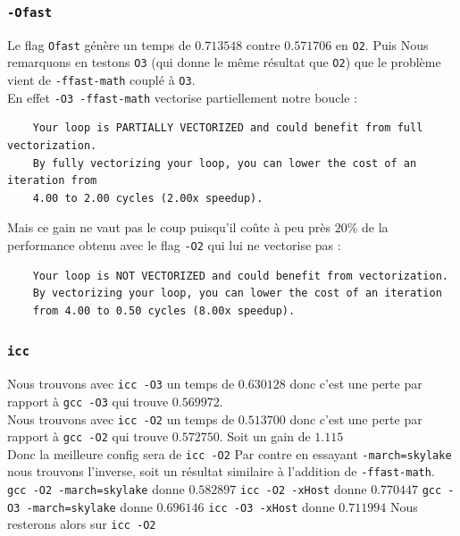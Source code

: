 \documentclass{report}
\begin{document}
  \subsubsection{\texttt{-Ofast}}
  Le flag \texttt{Ofast} génère un temps de $0.713548$ contre $0.571706$ en \texttt{O2}. Puis Nous remarquons
  en testons \texttt{O3} (qui donne le même résultat que \texttt{O2}) que le problème vient de \texttt{-ffast-math}
  couplé à \texttt{O3}. \\
  En effet \texttt{-O3 -ffast-math} vectorise partiellement notre boucle :
  \begin{verbatim}
    Your loop is PARTIALLY VECTORIZED and could benefit from full vectorization.
    By fully vectorizing your loop, you can lower the cost of an iteration from
    4.00 to 2.00 cycles (2.00x speedup).
  \end{verbatim}
  Mais ce gain ne vaut pas le coup puisqu'il coûte à peu près $20\%$ de
  la performance obtenu avec le flag \texttt{-O2} qui lui ne vectorise pas :
  \begin{verbatim}
    Your loop is NOT VECTORIZED and could benefit from vectorization.
    By vectorizing your loop, you can lower the cost of an iteration
    from 4.00 to 0.50 cycles (8.00x speedup).
  \end{verbatim}
  \subsubsection{\texttt{icc}}
  Nous trouvons avec \texttt{icc -O3} un temps de $0.630128$ donc c'est une
  perte par rapport à \texttt{gcc -O3} qui trouve $0.569972$.\\
  Nous trouvons avec \texttt{icc -O2} un temps de $0.513700$ donc c'est une
  perte par rapport à \texttt{gcc -O2} qui trouve $0.572750$. Soit un gain
  de $1.115$\\
  Donc la meilleure config sera de \texttt{icc -O2}
  Par contre en essayant \texttt{-march=skylake} nous trouvons l'inverse, soit
  un résultat similaire à l'addition de \texttt{-ffast-math}.
  \texttt{gcc -O2 -march=skylake} donne $0.582897$
  \texttt{icc -O2 -xHost} donne $0.770447$
  \texttt{gcc -O3 -march=skylake} donne $0.696146$
  \texttt{icc -O3 -xHost} donne $0.711994$
  Nous resterons alors sur \texttt{icc -O2}
\end{document}
